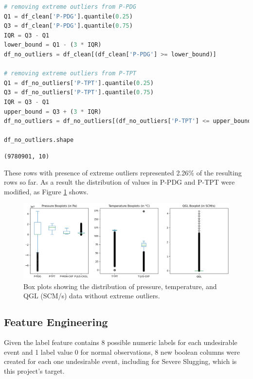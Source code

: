 \documentclass{article}
\begin{document}
\begin{lstlisting}[language=Python]
# removing extreme outliers from P-PDG 
Q1 = df_clean['P-PDG'].quantile(0.25)
Q3 = df_clean['P-PDG'].quantile(0.75)
IQR = Q3 - Q1
lower_bound = Q1 - (3 * IQR)
df_no_outliers = df_clean[(df_clean['P-PDG'] >= lower_bound)]

# removing extreme outliers from P-TPT
Q1 = df_no_outliers['P-TPT'].quantile(0.25)
Q3 = df_no_outliers['P-TPT'].quantile(0.75)
IQR = Q3 - Q1
upper_bound = Q3 + (3 * IQR)
df_no_outliers = df_no_outliers[(df_no_outliers['P-TPT'] <= upper_bound)]

df_no_outliers.shape
\end{lstlisting}
\begin{verbatim}
(9780901, 10)
\end{verbatim}

These rows with presence of extreme outliers represented 2.26\% of the resulting rows so far. As a result the distribution of values in P-PDG and P-TPT were modified, as Figure \ref{fig:distr_boxplots_after_cleaning} shows.

\begin{figure}
\centering
\includegraphics[width=1\textwidth]{distr_boxplots_after_cleaning.png}
\caption{\label{fig:distr_boxplots_after_cleaning}Box plots showing the distribution of pressure, temperature, and QGL (SCM/s) data without extreme outliers.}
\end{figure}


\subsection{Feature Engineering}

Given the label feature contains 8 possible numeric labels for each undesirable event and 1 label value 0 for normal observations, 8 new boolean columns were created for each one undesirable event, including for Severe Slugging, which is this project's target.
\end{document}
